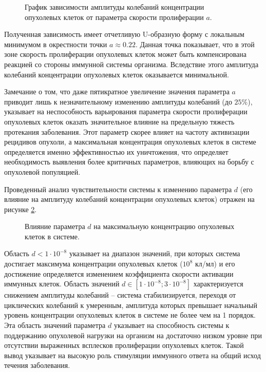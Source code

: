 \begin{figure}[ht!]
  \centering
  
  \caption{График зависимости амплитуды колебаний концентрации опухолевых клеток от
  параметра скорости пролиферации $a$.}
  \label{fig:a_amp}
\end{figure}

Полученная зависимость имеет отчетливую U-образную форму с локальным минимумом
в окрестности точки $a \approx 0.22$. Данная точка показывает, что в этой зоне
скорость пролиферации опухолевых клеток может быть компенсирована реакцией со
стороны иммунной системы организма. Вследствие этого амплитуда колебаний
концентрации опухолевых клеток оказывается минимальной.

Замечание о том, что даже пятикратное увеличение значения параметра $a$
приводит лишь к незначительному изменению амплитуды колебаний (до $25\%$),
указывает на неспособность варьирования параметра скорости пролиферации
опухолевых клеток оказать значительное влияние на предельную тяжесть протекания
заболевания. Этот параметр скорее влияет на частоту активизации рецидивов
опухоли, а максимальная концентрация опухолевых клеток в системе определяется
именно эффективностью их уничтожения, что определяет необходимость выявления
более критичных параметров, влияющих на борьбу с опухолевой популяцией.

Проведенный анализ чувствительности системы к изменению параметра $d$ (его
влияние на амплитуду колебаний концентрации опухолевых клеток) отражен на
рисунке \ref{fig:d_amp}.

\begin{figure}[ht!]
  \centering
  
  \caption{Влияние параметра $d$ на максимальную концентрацию опухолевых клеток
  в системе.}
  \label{fig:d_amp}
\end{figure}

Область $d < 1 \cdot 10^{-8}$ указывает на диапазон значений, при которых система
достигает максимума концентрации опухолевых клеток ($10^8$ кл/мл) и его
достижение определяется изменением коэффициента скорости активации иммунных клеток.
Область значений $d \in [1 \cdot 10^{-8}; 3 \cdot 10^{-8}]$ характеризуется
снижением амплитуды колебаний -- система стабилизируется, переходя от
циклических колебаний к умеренным, амплитуда которых превышает начальный
уровень концентрации опухолевых клеток в системе не более чем на 1 порядок.
Эта область значений параметра $d$ указывает на способность системы к
поддержанию опухолевой нагрузки на организм на достаточно низком уровне при
отсутствии выраженных всплесков пролиферации опухолевых клеток. Такой вывод
указывает на высокую роль стимуляции иммунного ответа на общий исход течения заболевания.

